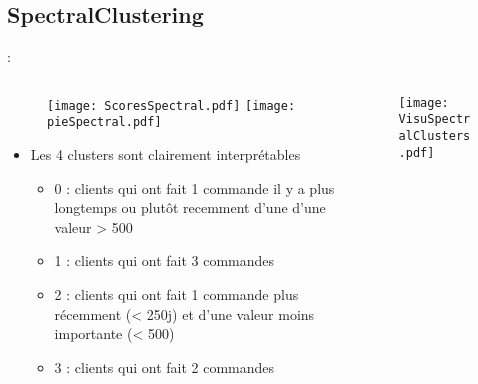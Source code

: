 \documentclass[8pt,aspectratio=169,hyperref={unicode=true}]{beamer}
\begin{document}
\subsection{SpectralClustering}
\begin{frame}{\insertsection: \insertsubsection}
    \begin{columns}
        \begin{column}{.55\textwidth}
            \begin{figure}
                \texttt{[image: ScoresSpectral.pdf]}
                \texttt{[image: pieSpectral.pdf]}
            \end{figure}
            \begin{itemize}
                \item Les 4 clusters sont clairement interprétables
                      \begin{itemize}
                          \item 0 : clients qui ont fait 1 commande il y a plus longtemps ou plutôt recemment d'une d'une valeur > 500
                          \item 1 : clients qui ont fait 3 commandes
                          \item 2 : clients qui ont fait 1 commande plus récemment (< 250j) et d'une valeur moins importante (< 500)
                          \item 3 : clients qui ont fait 2 commandes
                      \end{itemize}
            \end{itemize}
        \end{column}
        \begin{column}{.45\textwidth}
            \begin{figure}
                \texttt{[image: VisuSpectralClusters.pdf]}
            \end{figure}
        \end{column}
    \end{columns}
\end{frame}
\end{document}
